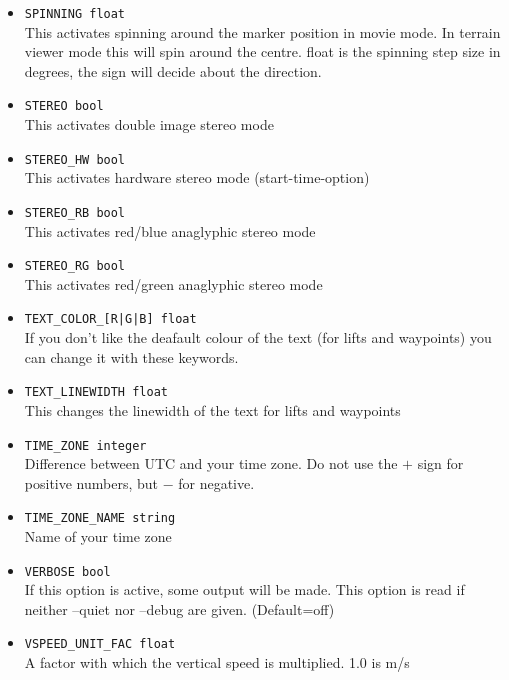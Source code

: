\begin{itemize}
\item \texttt{SPINNING float} \\
This activates spinning around the marker position in movie mode.
In terrain viewer mode this will spin around the centre.
float is the spinning step size in degrees, the sign will decide about the
direction.

\item \texttt{STEREO bool} \\
This activates double image stereo mode

\item \texttt{STEREO\_HW bool} \\
This activates hardware stereo mode (start-time-option)

\item \texttt{STEREO\_RB bool} \\
This activates red/blue anaglyphic stereo mode

\item \texttt{STEREO\_RG bool} \\
This activates red/green anaglyphic stereo mode

\item \texttt{TEXT\_COLOR\_[R|G|B] float}\\
If you don't like the deafault colour of the text (for lifts and waypoints) you can change it with these keywords.

\item \texttt{TEXT\_LINEWIDTH float}\\
This changes the linewidth of the text for lifts and waypoints

\item \texttt{TIME\_ZONE integer} \\
Difference between UTC and your time zone. Do not use the $+$ sign for positive numbers, but $-$ for negative.

\item \texttt{TIME\_ZONE\_NAME string} \\
Name of your time zone

\item \texttt{VERBOSE bool} \\
If this option is active, some output will be made. This option is read if neither --quiet nor --debug are given. (Default=off)

\item \texttt{VSPEED\_UNIT\_FAC float} \\
A factor with which the vertical speed is multiplied. 1.0 is m/s


\end{itemize}
